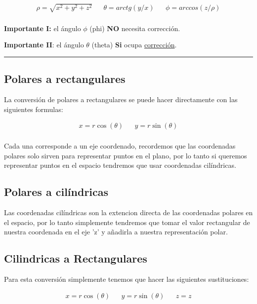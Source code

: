 \documentclass{article}
\begin{document}
\[\begin{aligned}
 \rho = \sqrt{x^2+y^2+z^2} && 
 \theta = arctg\left( y/x \right)  &&
 \phi = arccos\left( z/\rho \right) \\
\end{aligned}\] 

\textbf{Importante I:} el ángulo \(\phi\) (phi) \textbf{NO} necesita corrección.

\textbf{Importante II}: el ángulo \(\theta\) (theta) \textbf{Si} ocupa \hyperref[tab:orga0c1d5f]{corrección}.

\noindent\rule{\textwidth}{0.5pt}

\subsection{Polares a rectangulares}
\label{sec:org4976583}
La conversión de polares a rectangulares se puede hacer directamente con las siguientes formulas: 

\[\begin{aligned}
 x = r \cos(\theta) && y = r \sin(\theta) \\
\end{aligned}\] 

Cada una corresponde a un eje coordenado, recordemos que las coordenadas polares solo sirven para representar puntos en el plano, por lo tanto si queremos representar puntos en el espacio tendremos que usar coordenadas cilíndricas.

\subsection{Polares a cilíndricas}
\label{sec:org077a669}
Las coordenadas cilíndricas son la extencion directa de las coordenadas polares en el espacio, por lo tanto simplemente tendremos que tomar el valor rectangular de nuestra coordenada en el eje 'z' y añadirla a nuestra representación polar.

\subsection{Cilindricas a Rectangulares}
\label{sec:org0a7316f}
Para esta conversión simplemente tenemos que hacer las siguientes sustituciones:

\[\begin{aligned}
 x = r \cos(\theta) && y = r \sin(\theta) && z = z \\
\end{aligned}\] 
\end{document}
